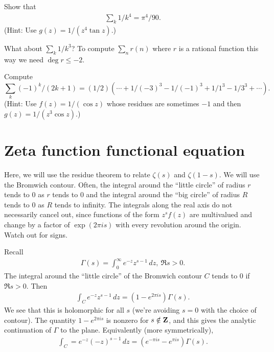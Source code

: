 \documentclass[11pt, oneside,margin=1in]{article}
\begin{document}
\begin{exercise}\label{}\text{}
Show that
\begin{align*}
	\sum_k 1/k^4 = \pi^4 /90.
\end{align*}
(Hint: Use $g(z) = 1/ (z^4\tan z)$.)
\end{exercise}

What about $\sum_k 1/k^3$? To compute $\sum_n r(n)$ where $r$ is a rational function this way we need $\deg r \le -2$.

\begin{exercise}\label{}\text{}
Compute
\[
\sum_k (-1)^k/ (2k+1) = ({1}/{2}) \left( \cdots + 1/(-3)^3 - 1/ (-1)^3 + 1/1^3 - 1/3^3 + \cdots \right). 
\]
(Hint: Use $f(z) = 1/ (\cos z)$ whose residues are sometimes $-1$ and then $g(z) = 1/ (z^3\cos z)$.)
\end{exercise}

\section{Zeta function functional equation}
Here, we will use the residue theorem to relate $\zeta(s)$ and $\zeta(1-s)$. We will use the Bromwich contour. Often, the integral around the ``little circle'' of radius $r$ tends to $0$ as $r$ tends to $0$ and the integral around the ``big circle'' of radius $R$ tends to $0$ as $R$ tends to infinity. The integrals along the real axis do not necessarily cancel out, since functions of the form $z^sf(z)$ are multivalued and change by a factor of $\exp (2\pi i s)$ with every revolution around the origin. Watch out for signs.

\begin{example}[ ]\label{}\text{}
Recall
\begin{align*}
	\Gamma (s) = \int_0^\infty e^{-z}z^{s-1}\, dz,\ \Re s>0.
\end{align*}
The integral around the ``little circle'' of the Bromwich contour $C$ tends to $0$ if $\Re s>0$. Then
\begin{align*}
	\int_C e^{-z} z^{s-1}\, dz = (1-e^{2\pi is}) \Gamma (s).
\end{align*}
We see that this is holomorphic for all $s$ (we're avoiding $s=0$ with the choice of contour). The quantity $1-e^{2\pi i s}$ is nonzero for $s\notin \mathbf Z$, and this gives the analytic continuation of $\Gamma$ to the plane. Equivalently (more symmetrically),
 \begin{align*}
	\int_C = e^{-z}(-z)^{s-1}\, dz =  (e^{-\pi i s} - e^{\pi i s}) \Gamma  (s).
\end{align*}
\end{example}
\end{document}
